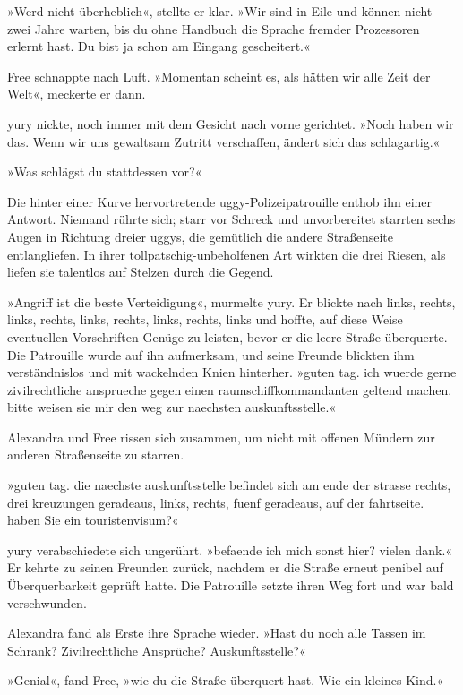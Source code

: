 »Werd nicht überheblich«, stellte er klar. »Wir sind in Eile und können nicht zwei Jahre warten, bis du ohne Handbuch die Sprache fremder Prozessoren erlernt hast. Du bist ja schon am Eingang gescheitert.«

Free schnappte nach Luft. »Momentan scheint es, als hätten wir alle Zeit der Welt«, meckerte er dann.

yury nickte, noch immer mit dem Gesicht nach vorne gerichtet. »Noch haben wir das. Wenn wir uns gewaltsam Zutritt verschaffen, ändert sich das schlagartig.«

»Was schlägst du stattdessen vor?«

Die hinter einer Kurve hervortretende uggy-Polizeipatrouille enthob ihn einer Antwort. Niemand rührte sich; starr vor Schreck und unvorbereitet starrten sechs Augen in Richtung dreier uggys, die gemütlich die andere Straßenseite entlangliefen. In ihrer tollpatschig-unbeholfenen Art wirkten die drei Riesen, als liefen sie talentlos auf Stelzen durch die Gegend.

»Angriff ist die beste Verteidigung«, murmelte yury. Er blickte nach links, rechts, links, rechts, links, rechts, links, rechts, links und hoffte, auf diese Weise eventuellen Vorschriften Genüge zu leisten, bevor er die leere Straße überquerte. Die Patrouille wurde auf ihn aufmerksam, und seine Freunde blickten ihm verständnislos und mit wackelnden Knien hinterher. »guten tag. ich wuerde gerne zivilrechtliche ansprueche gegen einen raumschiffkommandanten geltend machen. bitte weisen sie mir den weg zur naechsten auskunftsstelle.«

Alexandra und Free rissen sich zusammen, um nicht mit offenen Mündern zur anderen Straßenseite zu starren.

»guten tag. die naechste auskunftsstelle befindet sich am ende der strasse rechts, drei kreuzungen geradeaus, links, rechts, fuenf geradeaus, auf der fahrtseite. haben Sie ein touristenvisum?«

yury verabschiedete sich ungerührt. »befaende ich mich sonst hier? vielen dank.« Er kehrte zu seinen Freunden zurück, nachdem er die Straße erneut penibel auf Überquerbarkeit geprüft hatte. Die Patrouille setzte ihren Weg fort und war bald verschwunden.

Alexandra fand als Erste ihre Sprache wieder. »Hast du noch alle Tassen im Schrank? Zivilrechtliche Ansprüche? Auskunftsstelle?«

»Genial«, fand Free, »wie du die Straße überquert hast. Wie ein kleines Kind.«

